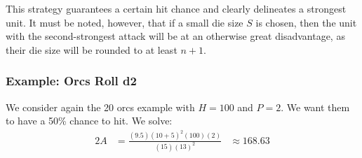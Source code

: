 \documentclass{article}
\begin{document}
This strategy guarantees a certain hit chance and clearly delineates a strongest unit.
It must be noted, however, that if a small die size $S$ is chosen,
then the unit with the second-strongest attack will be at an otherwise great disadvantage,
as their die size will be rounded to at least $n + 1$.


\subsubsection{Example: Orcs Roll d2}

We consider again the 20 orcs example with $H = 100$ and $P = 2$.
We want them to have a 50\% chance to hit.
We solve:
\begin{alignat*}{2}
    A &= 
        \frac
            {(9.5) (10 + 5)^2 (100) (2)}
            {(15) (13)^2}
        &{}\approx{} 168.63
\end{alignat*}
\end{document}
